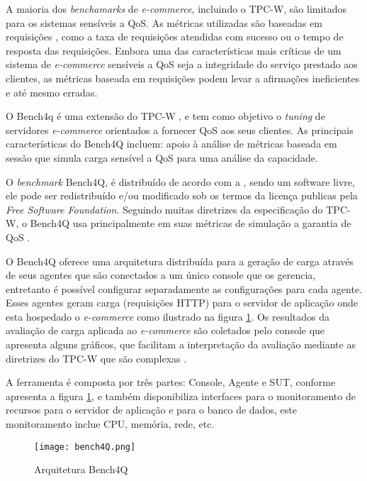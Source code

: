 A maioria dos \textit{benchamarks} de \textit{e-commerce}, incluindo o TPC-W, são limitados para os sistemas sensíveis a QoS. As métricas utilizadas são baseadas em requisições , como a taxa de requisições atendidas com sucesso ou o tempo de resposta das requisições. Embora uma das características mais críticas de um sistema de \textit{e-commerce} sensíveis a QoS seja a integridade do serviço prestado aos clientes, as métricas baseada em requisições podem levar a afirmações ineficientes e até mesmo erradas.

O Bench4q é uma extensão do TPC-W \cite{Menasce2002}, e tem como objetivo o \textit{tuning} de servidores \textit{e-commerce} orientados a fornecer QoS aos seus clientes. As principais características do Bench4Q incluem: 
apoio à análise de métricas baseada em sessão que simula carga sensível a QoS para uma análise da capacidade. 

O \textit{benchmark} Bench4Q, é distribuído de acordo com a , sendo um software livre, ele pode ser redistribuído e/ou modificado sob os termos da licença publicas pela \textit{Free Software Foundation}. Seguindo muitas diretrizes da especificação do TPC-W, o Bench4Q usa principalmente em suas métricas de simulação a garantia de QoS \cite{Bench4Q}. 

O Bench4Q oferece uma arquitetura distribuída para a geração de carga através de seus agentes que são conectados a um único console que os gerencia, entretanto é possível configurar separadamente as configurações para cada agente. Esses agentes geram carga (requisições HTTP) para o servidor de aplicação onde esta hospedado o \textit{e-commerce} como ilustrado na figura \ref{fig:arquitetura-bench4q}. Os resultados da avaliação de carga aplicada ao \textit{e-commerce} são coletados pelo console que apresenta alguns gráficos, que facilitam a interpretação da avaliação mediante as diretrizes do TPC-W que são complexas \cite{Bench4Q}.

A ferramenta é composta por três partes: Console, Agente e SUT, conforme apresenta a figura \ref{fig:arquitetura-bench4q}, e também disponibiliza interfaces para o monitoramento de recursos para o servidor de aplicação e para o banco de dados, este monitoramento inclue CPU, memória, rede, etc.


\begin{figure}[htb]
	\centering
	\texttt{[image: bench4Q.png]}
	\caption{Arquitetura Bench4Q}
	\label{fig:arquitetura-bench4q}
\end{figure}

